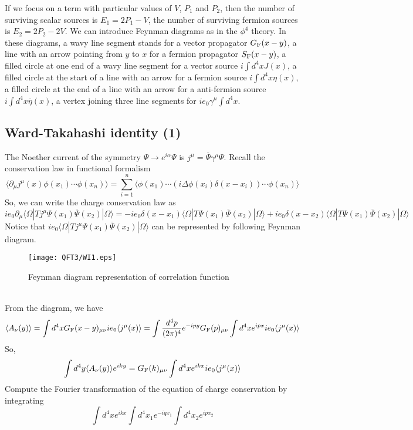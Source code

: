 If we focus on a term with particular values of $V$, $P_1$ and $P_2$, then the number of surviving scalar sources is $E_1 = 2P_1-V$, the number of surviving fermion sources is $E_2 = 2P_2-2V$.
We can introduce Feynman diagrams as in the $\phi^4$ theory. In these diagrams, a wavy line segment stands for a vector propagator $G_{\rm F}(x-y)$, a line with an arrow pointing from $y$ to $x$ for a fermion propagator $S_{\rm F}(x-y)$, a filled circle at one end of a wavy line segment for a vector source $i\int d^4x J(x)$, a filled circle at the start of a line with an arrow for a fermion source $i\int d^4x \eta(x)$, a filled circle at the end of a line with an arrow for a anti-fermion source $i\int d^4x \overline{\eta}(x)$, a vertex joining three line segments for $ie_0\gamma^{\mu}\int d^4x$.

\subsection{Ward-Takahashi identity (1)}
The Noether current of the symmetry $\Psi \to e^{i\alpha}\Psi$ is $j^{\mu} = \overline{\Psi}\gamma^{\mu}\Psi$. Recall the conservation law in functional formalism
\[\langle \partial_{\mu} j^{\mu}(x) \phi(x_1)\cdots\phi(x_n) \rangle  = \sum_{i=1}^{n} \langle \phi(x_1) \cdots (i\Delta \phi(x_i)\delta(x-x_i)) \cdots \phi(x_n) \rangle\]
So, we can write the charge conservation law as
\[ie_0\partial_{\mu} \langle \Omega | T j^{\mu} \Psi(x_1) \overline{\Psi}(x_2)| \Omega\rangle = -ie_0\delta(x-x_1)\langle \Omega | T \Psi(x_1) \overline{\Psi}(x_2)| \Omega\rangle + ie_0\delta(x-x_2)\langle \Omega | T \Psi(x_1) \overline{\Psi}(x_2)| \Omega\rangle\]
Notice that $ie_0\langle \Omega | T j^{\mu} \Psi(x_1) \overline{\Psi}(x_2)| \Omega\rangle$ can be represented by following Feynman diagram.
\begin{figure}[!h]
\centering
\texttt{[image: QFT3/WI1.eps]}
\caption{Feynman diagram representation of correlation function}
\end{figure}
\\
From the diagram, we have
\[\langle A_{\nu}(y) \rangle = \int d^4x G_{\rm F}(x-y)_{\mu\nu} ie_0\langle j^{\mu}(x) \rangle  = \int \frac{d^4p}{(2\pi)^4} e^{-ipy} G_{\rm F}(p)_{\mu\nu} \int d^4x e^{ipx} ie_0\langle j^{\mu}(x) \rangle\]
So,
\[\int d^4y \langle A_{\nu}(y) \rangle e^{iky} = G_{\rm F}(k)_{\mu\nu} \int d^4x e^{ikx} ie_0\langle j^{\mu}(x)\rangle\]
Compute the Fourier transformation of the equation of charge conservation by integrating
\[\int d^4x e^{ikx} \int d^4x_1 e^{-iqx_1} \int d^4x_2 e^{ipx_2}\]
